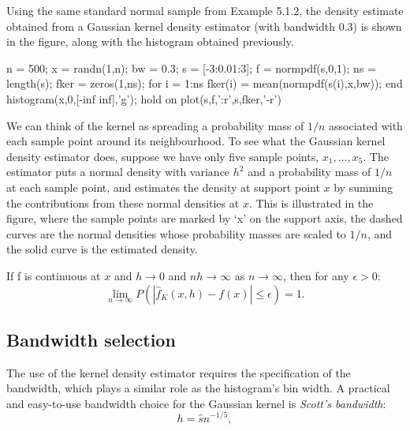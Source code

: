 \begin{labwork}
Using the same standard normal sample from Example 5.1.2, the density estimate obtained from a Gaussian kernel density estimator (with bandwidth 0.3) is shown in the figure, along with the histogram obtained previously.
\begin{VrbM}
n = 500;
x = randn(1,n);
bw = 0.3;
s = [-3:0.01:3]; %
f = normpdf(s,0,1); %
ns = length(s); %
fker = zeros(1,ns); %
for i = 1:ns
    fker(i) = mean(normpdf(s(i),x,bw));
end
histogram(x,0,[-inf inf],'g'); hold on
plot(s,f,':r',s,fker,'-r')
\end{VrbM}
\end{labwork}

We can think of the kernel as spreading a probability mass of $1/n$ associated with each sample point around its neighbourhood. To see what the Gaussian kernel density estimator does, suppose we have only five sample points, $x_1,\ldots,x_5$. The estimator puts a normal density with variance $h^2$ and a probability mass of $1/n$ at each sample point, and estimates the density at support point $x$ by summing the contributions from these normal densities at $x$. This is illustrated in the figure, where the sample points are marked by \textquoteleft x' on the support axis, the dashed curves are the normal densities whose probability masses are scaled to $1/n$, and the solid curve is the estimated density.

If f is continuous at $x$ and $h\rightarrow 0$ and $nh\rightarrow\infty$ as $n\rightarrow\infty$, then for any $\epsilon > 0$:
\begin{equation}
\lim_{n\rightarrow\infty}P(|\hat{f}_K(x,h)-f(x)|\leq\epsilon)=1.
\end{equation}

\subsection{Bandwidth selection}
The use of the kernel density estimator requires the specification of the bandwidth, which plays a similar role as the histogram's bin width. A practical and easy-to-use bandwidth choice for the Gaussian kernel is {\it Scott's bandwidth}:
\begin{equation}
h=\hat{s}n^{-1/5},
\end{equation}

